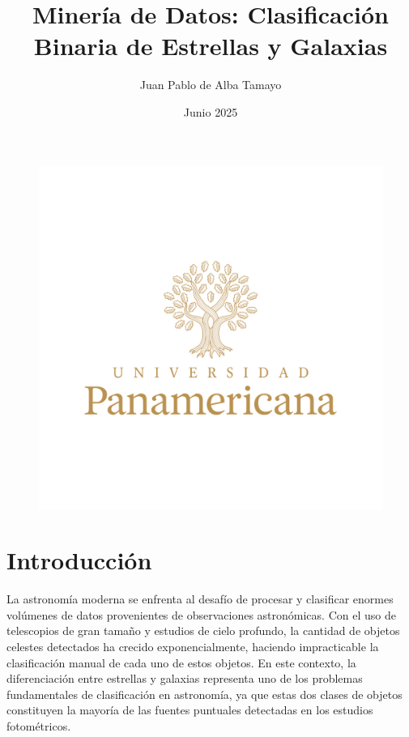 \documentclass{article}
\title{Minería de Datos: Clasificación Binaria de Estrellas y Galaxias}
\author{Juan Pablo de Alba Tamayo}
\date{Junio 2025}
\begin{document}
\begin{figure}[H]
    \centering
    \includegraphics[width=0.75\linewidth]{logo.png}
\end{figure}

\newpage

\maketitle

\newpage

\tableofcontents

\newpage

\listoffigures

\newpage

\section{Introducción}

La astronomía moderna se enfrenta al desafío de procesar y clasificar enormes volúmenes de datos provenientes de observaciones astronómicas. Con el uso de telescopios de gran tamaño y estudios de cielo profundo, la cantidad de objetos celestes detectados ha crecido exponencialmente, haciendo impracticable la clasificación manual de cada uno de estos objetos. En este contexto, la diferenciación entre estrellas y galaxias representa uno de los problemas fundamentales de clasificación en astronomía, ya que estas dos clases de objetos constituyen la mayoría de las fuentes puntuales detectadas en los estudios fotométricos.
\end{document}
